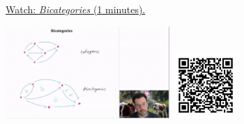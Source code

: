 
\begin{minipage}{10cm}
    \href{https://act4e-spring21.netlify.app/videos/spring2021-nat-trafos:natural-trafos:bicategories.html}{Watch: \emph{Bicategories} (1 minutes).}
        
    \href{https://act4e-spring21.netlify.app/videos/spring2021-nat-trafos:natural-trafos:bicategories.html}{\includegraphics[height=3.5cm]{spring2021-nat-trafos:natural-trafos:bicategories/thumbnails.jpg}}
    \href{https://act4e-spring21.netlify.app/videos/spring2021-nat-trafos:natural-trafos:bicategories.html}{\includegraphics[height=2.5cm]{spring2021-nat-trafos:natural-trafos:bicategories/qrcode.png}}
\end{minipage}
